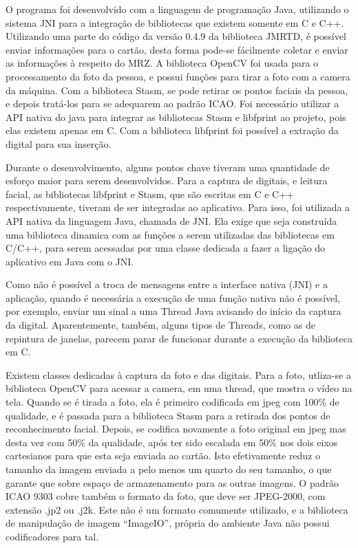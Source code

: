 \documentclass[11pt]{article}
\begin{document}
		O programa foi desenvolvido com a linguagem de programação Java, utilizando o sistema JNI para a integração de bibliotecas que existem somente em C e C++. Utilizando uma parte do código da versão 0.4.9 da biblioteca JMRTD, é possível enviar informações para o cartão, desta forma pode-se fácilmente coletar e enviar as informações à respeito do MRZ. A biblioteca OpenCV foi usada para o processamento da foto da pessoa, e possui funções para tirar a foto com a camera da máquina. Com a biblioteca Stasm, se pode retirar os pontos faciais da pessoa, e depois tratá-los para se adequarem ao padrão ICAO. Foi necessário utilizar a API nativa do java para integrar as bibliotecas Stasm e libfprint ao projeto, pois elas existem apenas em C. Com a biblioteca libfprint foi possível a extração da digital para sua inserção.
		
		Durante o desenvolvimento, alguns pontos chave tiveram uma quantidade de esforço maior para serem desenvolvidos. Para a captura de digitais, e leitura facial, as bibliotecas libfprint e Stasm, que são escritas em C e C++ respectivamente, tiveram de ser integradas ao aplicativo. Para isso, foi utilizada a API nativa da linguagem Java, chamada de JNI. Ela exige que seja construída uma biblioteca dinamica com as funções a serem utilizadas das bibliotecas em C/C++, para serem acessadas por uma classe dedicada a fazer a ligação do aplicativo em Java com o JNI.
		
		Como não é possível a troca de mensagens entre a interface nativa (JNI) e a aplicação, quando é necessária a execução de uma função nativa não é possível, por exemplo, enviar um sinal a uma Thread Java avisando do início da captura da digital. Aparentemente, também, alguns tipos de Threads, como as de repintura de janelas, parecem parar de funcionar durante a execução da biblioteca em C.
		
		Existem classes dedicadas à captura da foto e das digitais. Para a foto, utliza-se a biblioteca OpenCV para acessar a camera, em uma thread, que mostra o vídeo na tela. Quando se é tirada a foto, ela é primeiro codificada em jpeg com 100\% de qualidade, e é passada para a biblioteca Stasm para a retirada dos pontos de reconhecimento facial. Depois, se codifica novamente a foto original em jpeg mas desta vez com 50\% da qualidade, após ter sido escalada em 50\% nos dois eixos cartesianos para que esta seja enviada ao cartão. Isto efetivamente reduz o tamanho da imagem enviada a pelo menos um quarto do seu tamanho, o que garante que sobre espaço de armazenamento para as outras imagens. O padrão ICAO 9303 cobre também o formato da foto, que deve ser JPEG-2000, com extensão .jp2 ou .j2k. Este não é um formato comumente utilizado, e a biblioteca de manipulação de imagem ``ImageIO'', própria do ambiente Java não possui codificadores para tal.
		
\end{document}
